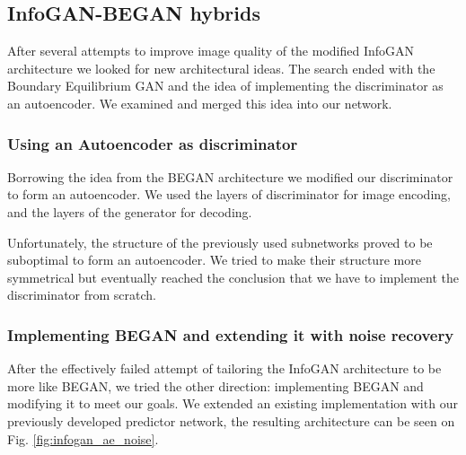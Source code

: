 \documentclass[10pt,journal,compsoc]{IEEEtran}
\begin{document}
\subsection{InfoGAN-BEGAN hybrids}

After several attempts to improve image quality of the modified InfoGAN architecture we looked for new architectural ideas. The search ended with the Boundary Equilibrium GAN and the idea of implementing the discriminator as an autoencoder. We examined and merged this idea into our network.

\subsubsection{Using an Autoencoder as discriminator}

Borrowing the idea from the BEGAN architecture we modified our discriminator to form an autoencoder. We used the layers of discriminator for image encoding, and the layers of the generator for decoding.

Unfortunately, the structure of the previously used subnetworks proved to be suboptimal to form an autoencoder. We tried to make their structure more symmetrical but eventually reached the conclusion that we have to implement the discriminator from scratch.

\subsubsection{Implementing BEGAN and extending it with noise recovery}

After the effectively failed attempt of tailoring the InfoGAN architecture to be more like BEGAN, we tried the other direction: implementing BEGAN and modifying it to meet our goals. We extended an existing implementation with our previously developed predictor network, the resulting architecture can be seen on Fig. \ref{fig:infogan_ae_noise}.
\end{document}
